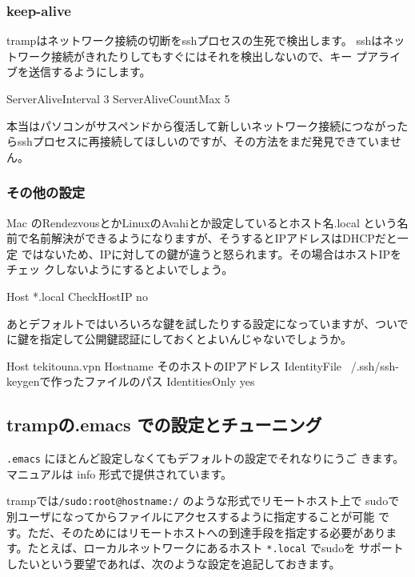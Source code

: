 \documentclass[mingoth,a4paper]{jsarticle}
\begin{document}
\subsubsection{keep-alive}

trampはネットワーク接続の切断をsshプロセスの生死で検出します。
sshはネットワーク接続がきれたりしてもすぐにはそれを検出しないので、キー
プアライブを送信するようにします。

\begin{commandline}
 ServerAliveInterval 3
 ServerAliveCountMax 5
\end{commandline}


本当はパソコンがサスペンドから復活して新しいネットワーク接続につながった
らsshプロセスに再接続してほしいのですが、その方法をまだ発見できていませ
ん。

\subsubsection{その他の設定}

Mac のRendezvousとかLinuxのAvahiとか設定しているとホスト名.local という名
前で名前解決ができるようになりますが、そうするとIPアドレスはDHCPだと一定
ではないため、IPに対しての鍵が違うと怒られます。その場合はホストIPをチェッ
クしないようにするとよいでしょう。

\begin{commandline}
 Host *.local
  CheckHostIP no
\end{commandline}

あとデフォルトではいろいろな鍵を試したりする設定になっていますが、ついで
に鍵を指定して公開鍵認証にしておくとよいんじゃないでしょうか。

\begin{commandline}
 Host tekitouna.vpn
  Hostname そのホストのIPアドレス
  IdentityFile ~/.ssh/ssh-keygenで作ったファイルのパス
  IdentitiesOnly yes
\end{commandline}


\subsection{trampの.emacs での設定とチューニング}

\texttt{.emacs} にほとんど設定しなくてもデフォルトの設定でそれなりにうご
きます。
マニュアルは info 形式で提供されています\cite{trampinfomanual}。

trampでは\texttt{/sudo:root@hostname:/} のような形式でリモートホスト上で
sudoで別ユーザになってからファイルにアクセスするように指定することが可能
です。ただ、そのためにはリモートホストへの到達手段を指定する必要がありま
す。たとえば、ローカルネットワークにあるホスト \texttt{*.local} でsudoを
サポートしたいという要望であれば、次のような設定を追記しておきます。
\end{document}
